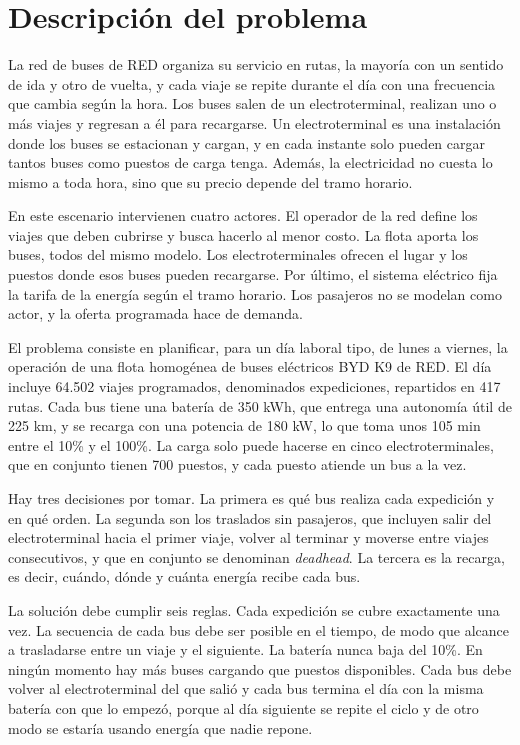 \section{Descripción del problema}


La red de buses de RED organiza su servicio en rutas, la mayoría con un sentido de ida y otro de vuelta, y cada viaje se repite durante el día con una frecuencia que cambia según la hora. Los buses salen de un electroterminal, realizan uno o más viajes y regresan a él para recargarse. Un electroterminal es una instalación donde los buses se estacionan y cargan, y en cada instante solo pueden cargar tantos buses como puestos de carga tenga. Además, la electricidad no cuesta lo mismo a toda hora, sino que su precio depende del tramo horario.

En este escenario intervienen cuatro actores. El operador de la red define los viajes que deben cubrirse y busca hacerlo al menor costo. La flota aporta los buses, todos del mismo modelo. Los electroterminales ofrecen el lugar y los puestos donde esos buses pueden recargarse. Por último, el sistema eléctrico fija la tarifa de la energía según el tramo horario. Los pasajeros no se modelan como actor, y la oferta programada hace de demanda.

El problema consiste en planificar, para un día laboral tipo, de lunes a viernes, la operación de una flota homogénea de buses eléctricos BYD K9 de RED. El día incluye 64.502 viajes programados, denominados expediciones, repartidos en 417 rutas. Cada bus tiene una batería de 350 kWh, que entrega una autonomía útil de 225 km, y se recarga con una potencia de 180 kW, lo que toma unos 105 min entre el 10\% y el 100\%. La carga solo puede hacerse en cinco electroterminales, que en conjunto tienen 700 puestos, y cada puesto atiende un bus a la vez.

Hay tres decisiones por tomar. La primera es qué bus realiza cada expedición y en qué orden. La segunda son los traslados sin pasajeros, que incluyen salir del electroterminal hacia el primer viaje, volver al terminar y moverse entre viajes consecutivos, y que en conjunto se denominan \textit{deadhead}. La tercera es la recarga, es decir, cuándo, dónde y cuánta energía recibe cada bus.

La solución debe cumplir seis reglas. Cada expedición se cubre exactamente una vez. La secuencia de cada bus debe ser posible en el tiempo, de modo que alcance a trasladarse entre un viaje y el siguiente. La batería nunca baja del 10\%. En ningún momento hay más buses cargando que puestos disponibles. Cada bus debe volver al electroterminal del que salió y cada bus termina el día con la misma batería con que lo empezó, porque al día siguiente se repite el ciclo y de otro modo se estaría usando energía que nadie repone.

